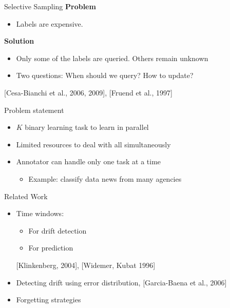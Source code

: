 \documentclass{beamer}
\begin{document}
\begin{frame}{Selective Sampling}
\textbf{Problem} \newline
\begin{itemize}
\item Labels are expensive.\newline
\end{itemize}
\textbf{Solution} \newline
\begin{itemize}
\item Only some of the labels are queried. Others remain unknown\newline
\item Two questions: When should we query? How to update?\newline
\end{itemize}
[Cesa-Bianchi et al., 2006, 2009], [Fruend et al., 1997]
\end{frame}

\begin{frame}{Problem statement}
\begin{itemize}
\item $K$ binary learning task to learn in parallel\newline
\item Limited resources to deal with all simultaneously \newline
\item Annotator can handle only one task at a time \newline
\begin{itemize}
\item Example: classify data news from many agencies\newline
\end{itemize}
\end{itemize}
\end{frame}


\begin{frame}{ Related Work}
\begin{itemize}
\item Time windows:\newline
\begin{itemize}
\item For drift detection\newline
\item For prediction\newline
\end{itemize}
[Klinkenberg, 2004], [Widemer, Kubat 1996]\newline
\item Detecting drift using error distribution\newline\newline
[Gama et al., 2004], [Garcia-Baena et al., 2006]\newline
\item Forgetting strategies\newline{}
\end{itemize}
\end{frame}
\end{document}

